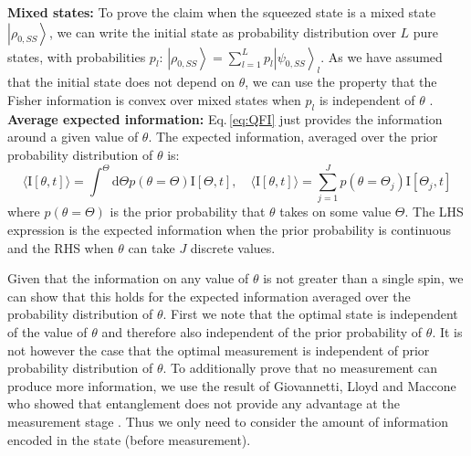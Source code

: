 \documentclass[reqno]{amsart}
\def\be{\begin{equation}}
\def\ee{\end{equation}}
\newcommand{\ket}[1]{\left| #1 \right>}
\def\func#1#2{\mathrm{#1}\left[#2\right]}
\begin{document}
\noindent \textbf{Mixed states:} To prove the claim when the squeezed state is a mixed state $\ket{\rho_{0,SS}}$, we can write the initial state as probability distribution over $L$ pure states, with probabilities $p_l$: $\ket{\rho_{0,SS}} = \sum_{l=1}^L p_l \ket{\psi_{0,SS}}_l$. As we have assumed that the initial state does not depend on $\theta$, we can use the property that the Fisher information is convex over mixed states when $p_l$ is independent of $\theta$ \cite{Liu2020}.\\




\noindent\textbf{Average expected information:} Eq.\,\eqref{eq:QFI} just provides the information around a given value of $\theta$. The expected information, averaged over the prior probability distribution of $\theta$ is:
\be \langle \func{I}{\theta,t}\rangle = \int^{\Theta} \mathrm{d}\Theta p(\theta=\Theta) \func{I}{\Theta,t}, \quad \langle \func{I}{\theta,t}\rangle = \sum_{j=1}^J p(\theta = \Theta_j) \func{I}{\Theta_j,t}
\ee
where $p(\theta = \Theta)$ is the prior probability that $\theta$ takes on some value $\Theta$. The LHS expression is the expected information when the prior probability is continuous and the RHS when $\theta$ can take $J$ discrete values.

Given that the information on any value of $\theta$ is not greater than a single spin, we can show that this holds for the expected information averaged over the probability distribution of $\theta$. First we note that the optimal state is independent of the value of $\theta$ and therefore also independent of the prior probability of $\theta$. It is not however the case that the optimal measurement is independent of prior probability distribution of $\theta$. To additionally prove that no measurement can produce more information, we use the result of Giovannetti, Lloyd and Maccone who showed that entanglement does not provide any advantage at the measurement stage \cite{Giovannetti2006}. Thus we only need to consider the amount of information encoded in the state (before measurement).\\
\end{document}
